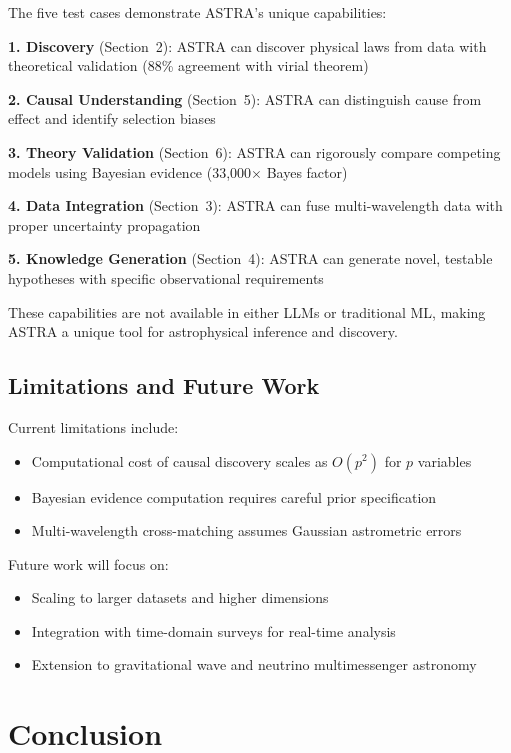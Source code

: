 \documentclass[usenatbib]{rasti}
\begin{document}
The five test cases demonstrate ASTRA's unique capabilities:

\textbf{1. Discovery} (Section~2): ASTRA can discover physical laws from data with theoretical validation (88\% agreement with virial theorem)

\textbf{2. Causal Understanding} (Section~5): ASTRA can distinguish cause from effect and identify selection biases

\textbf{3. Theory Validation} (Section~6): ASTRA can rigorously compare competing models using Bayesian evidence (33,000$\times$ Bayes factor)

\textbf{4. Data Integration} (Section~3): ASTRA can fuse multi-wavelength data with proper uncertainty propagation

\textbf{5. Knowledge Generation} (Section~4): ASTRA can generate novel, testable hypotheses with specific observational requirements

These capabilities are not available in either LLMs or traditional ML, making ASTRA a unique tool for astrophysical inference and discovery.

\subsection{Limitations and Future Work}

Current limitations include:
\begin{itemize}
\item Computational cost of causal discovery scales as $O(p^2)$ for $p$ variables
\item Bayesian evidence computation requires careful prior specification
\item Multi-wavelength cross-matching assumes Gaussian astrometric errors
\end{itemize}

Future work will focus on:
\begin{itemize}
\item Scaling to larger datasets and higher dimensions
\item Integration with time-domain surveys for real-time analysis
\item Extension to gravitational wave and neutrino multimessenger astronomy
\end{itemize}

\section{Conclusion}
\end{document}
